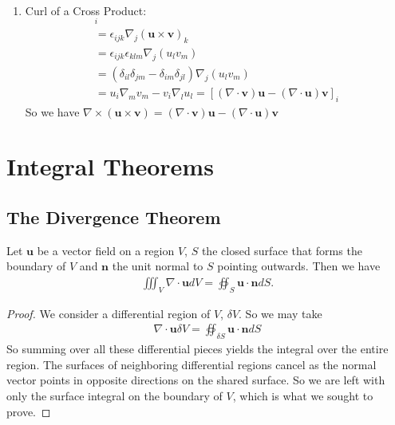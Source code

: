 \documentclass[]{article}
\begin{document}
\begin{enumerate}
		\item Curl of a Cross Product:
				\begin{align*}
						[\nabla \times (\mathbf{u} \times \mathbf{v})]_i \\
						= \epsilon_{ijk} \nabla_j (\mathbf{u} \times \mathbf{v})_k \\
						= \epsilon_{ijk} \epsilon_{kl m} \nabla_j (u_l v_m) \\
						= (\delta_{il}\delta_{jm} - \delta_{im}\delta_{jl}) \nabla_j (u_l v_m)\\
						= u_i \nabla_m v_m - v_i \nabla_l u_l
						= [(\nabla \cdot \mathbf{v}) \mathbf{u} - (\nabla \cdot \mathbf{u}) \mathbf{v}]_i
				\end{align*}
				So we have $\nabla \times (\mathbf{u} \times \mathbf{v}) = (\nabla \cdot \mathbf{v}) \mathbf{u} - (\nabla \cdot \mathbf{u}) \mathbf{v}$
\end{enumerate}

\section{Integral Theorems}

\subsection{The Divergence Theorem}

\begin{thm} 
		Let $\mathbf{u}$ be a vector field on a region $V$, $S$ the closed surface that forms the boundary of $V$ and $\mathbf{n}$ the unit normal to $S$ pointing outwards. Then we have
		\begin{align*}
				\iiint_V \nabla \cdot \mathbf{u} dV = \oiint_S \mathbf{u} \cdot \mathbf{n} dS.
		\end{align*}
\end{thm}

\begin{proof}
		We consider a differential region of $V$, $\delta V$. So we may take
		\begin{align*}
				\nabla \cdot \mathbf{u} \delta V = \oiint_{\delta S} \mathbf{u} \cdot \mathbf{n} dS
		\end{align*}
		So summing over all these differential pieces yields the integral over the entire region. The surfaces of neighboring differential regions cancel as the normal vector points in opposite directions on the shared surface. So we are left with only the surface integral on the boundary of $V$, which is what we sought to prove.
\end{proof}
\end{document}
